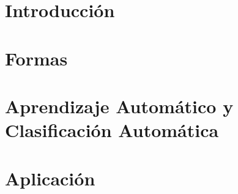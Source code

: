 \documentclass[a4paper,11pt]{book}
\begin{document}


\frontmatter


\tableofcontents
\listoftodos

\mainmatter

\chapter{Introducción}


\chapter{Formas}





\chapter{Aprendizaje Automático y Clasificación Automática}





\chapter{Aplicación}




\end{document}
